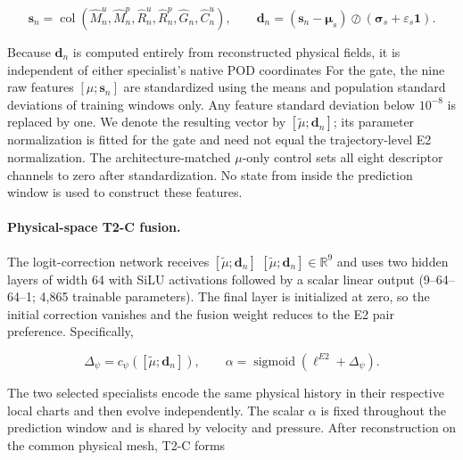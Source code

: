 \documentclass{article}
\providecommand{\DIFaddtex}[1]{{\protect\color{blue} \sf #1}} %
\providecommand{\DIFdeltex}[1]{{\protect\color{red} \scriptsize #1}} %
\providecommand{\DIFaddbegin}{} %
\providecommand{\DIFaddend}{} %
\providecommand{\DIFdelbegin}{} %
\providecommand{\DIFdelend}{} %
\providecommand{\DIFadd}[1]{\texorpdfstring{\DIFaddtex{#1}}{#1}} %
\providecommand{\DIFdel}[1]{\texorpdfstring{\DIFdeltex{#1}}{}} %
\begin{document}

{\color{red}
\begin{equation}
  \bm s_n
  =
  \operatorname{col}
  \left(
    \widehat M_n^u,
    \widehat M_n^p,
    \widehat R_n^u,
    \widehat R_n^p,
    \widehat G_n,
    \widehat C_n^u
  \right),
  \qquad
  \bm d_n
  =
  (\bm s_n-\bm\mu_s)
  \oslash
  (\bm\sigma_s+\varepsilon_s\bm 1).
  \label{old:eq:app_t2c_descriptor}
\end{equation}
}

\DIFdel{Because $\bm d_n$ is computed entirely from reconstructed physical fields,
it is independent of either specialist's native POD coordinates}\DIFdelend \DIFaddbegin \DIFadd{For the gate, the nine raw features $[\mu;\bm s_n]$ are standardized using the means and population standard deviations of training windows only. Any feature standard deviation below $10^{-8}$ is replaced by one. We denote the resulting vector by $[\widetilde\mu;\bm d_n]$; its parameter normalization is fitted for the gate and need not equal the trajectory-level E2 normalization. The architecture-matched $\mu$-only control sets all eight descriptor channels to zero after standardization. No state from inside the prediction window is used to construct these features}\DIFaddend .


\paragraph{Physical-space T2-C fusion.}
The logit-correction network receives
\DIFdelbegin \DIFdel{$[\widetilde\mu;\bm d_n]$ }\DIFdelend \DIFaddbegin \DIFadd{$[\widetilde\mu;\bm d_n]\in\mathbb R^9$ }\DIFaddend and uses two hidden layers of width 64 with SiLU
activations followed by a scalar linear output \DIFaddbegin \DIFadd{(9--64--64--1; 4,865 trainable parameters)}\DIFaddend .
The final layer is initialized at zero, so the initial correction vanishes
and the fusion weight reduces to the E2 pair preference.
Specifically,


\begin{equation}
  \Delta_\psi
  =
  c_\psi
  \left(
    [\widetilde\mu;\bm d_n]
  \right),
  \qquad
  \alpha
  =
  \operatorname{sigmoid}
  \left(
    \ell^{E2}+\Delta_\psi
  \right).
  \label{eq:app_t2c_gate}
\end{equation}



The two selected specialists encode the same physical history in their
respective local charts and then evolve independently.
The scalar $\alpha$ is fixed throughout the prediction window and is shared
by velocity and pressure.
After reconstruction on the common physical mesh, T2-C forms
\end{document}
